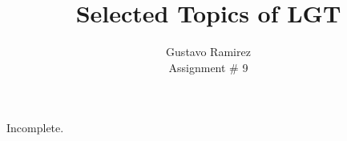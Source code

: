 \documentclass[11pt]{article}
\title{\textbf{Selected Topics of LGT}}
\author{Gustavo Ramirez\\
		Assignment \# 9}
\date{}
\begin{document}
\maketitle

Incomplete.
\end{document}
